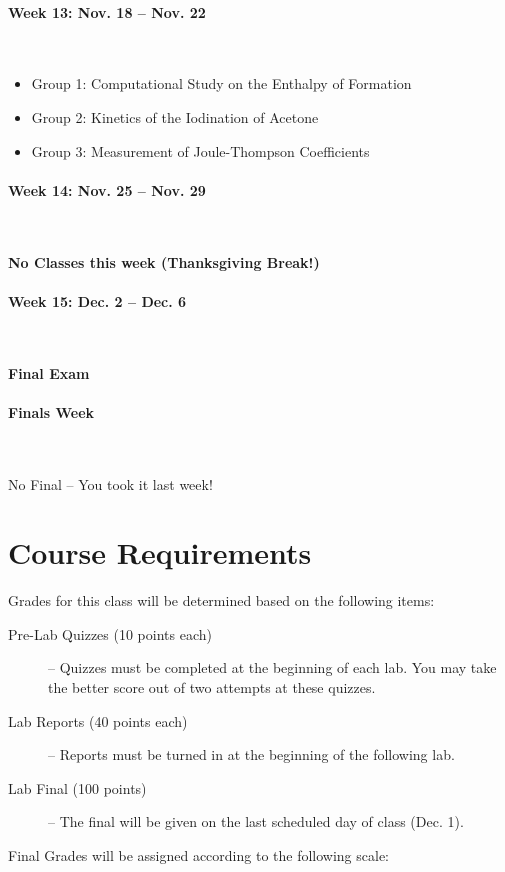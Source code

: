 \documentclass[12pt, letterpaper]{article}
\begin{document}
\paragraph{Week 13: Nov. 18 -- Nov. 22}~

\begin{itemize}
  \item Group 1: Computational Study on the Enthalpy of Formation
  \item Group 2: Kinetics of the Iodination of Acetone
  \item Group 3: Measurement of Joule-Thompson Coefficients
\end{itemize}

\paragraph{Week 14: Nov. 25 -- Nov. 29}~

\textbf{No Classes this week (Thanksgiving Break!)}


\paragraph{Week 15: Dec. 2 -- Dec. 6}~

\textbf{Final Exam}

\paragraph{Finals Week}~

No Final -- You took it last week!

\section*{Course Requirements}
Grades for this class will be determined based on the following items:

\begin{description}
	\item[Pre-Lab Quizzes (10 points each)] -- Quizzes must be completed at the beginning of each lab. You may take the better score out of two attempts at these quizzes.
	\item[Lab Reports (40 points each)] -- Reports must be turned in at the beginning of the following lab.
	\item[Lab Final (100 points)] -- The final will be given on the last scheduled day of class (Dec. 1).
\end{description}

\noindent Final Grades will be assigned according to the following scale:
\end{document}
